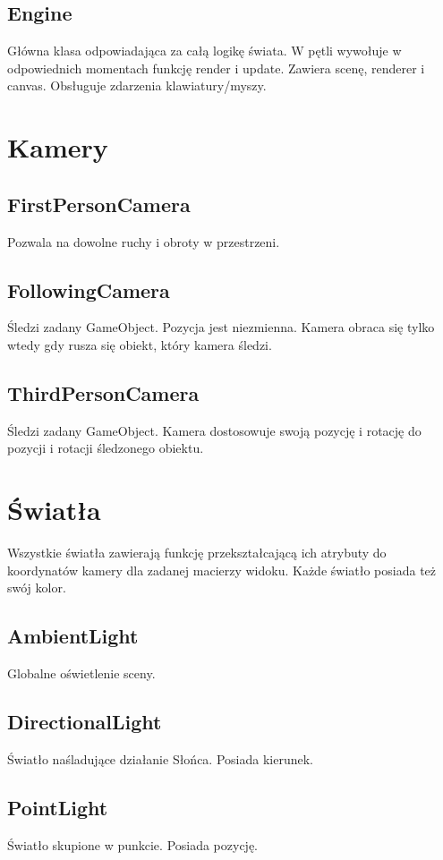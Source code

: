 \documentclass[onecolumn]{article}
\begin{document}
\subsection{Engine}
Główna klasa odpowiadająca za całą logikę świata. W pętli wywołuje w odpowiednich momentach funkcję render i update. Zawiera scenę, renderer i canvas. Obsługuje zdarzenia klawiatury/myszy.

\section{Kamery}

\subsection{FirstPersonCamera}
Pozwala na dowolne ruchy i obroty w przestrzeni.

\subsection{FollowingCamera}
Śledzi zadany GameObject. Pozycja jest niezmienna. Kamera obraca się tylko wtedy gdy rusza się obiekt, który kamera śledzi.


\subsection{ThirdPersonCamera}
Śledzi zadany GameObject. Kamera dostosowuje swoją pozycję i rotację do pozycji i rotacji śledzonego obiektu.

\section{Światła}
Wszystkie światła zawierają funkcję przekształcającą ich atrybuty do koordynatów kamery dla zadanej macierzy widoku. Każde światło posiada też swój kolor.

\subsection{AmbientLight}
Globalne oświetlenie sceny.

\subsection{DirectionalLight}
Światło naśladujące działanie Słońca. Posiada kierunek.

\subsection{PointLight}
Światło skupione w punkcie. Posiada pozycję.
\end{document}
